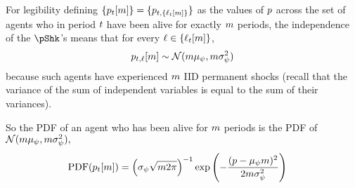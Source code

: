 \documentclass[\econtexRoot/BufferStockTheory.tex]{subfiles}
\begin{document}
For legibility defining $\{p_{{}t}[m]\} = \{p_{{}t,\{\ell_{{}t}[m]\}}\}$ as the values of $p$ across the set of agents who in period ${}t$ have been alive for exactly $m$ periods, the independence of the $\pShk$'s means that for every $\ell \in \{\ell_{t}[m]\}$,
\begin{equation}\begin{gathered}\begin{aligned}
  p_{t,\ell}[m] \sim \mathcal{N}(m \mu_{\psi},m \sigma^{2}_{\psi}) \label{eq:dstpnm}
\end{aligned}\end{gathered}\end{equation}
because such agents have experienced $m$ IID permanent shocks (recall that the variance of the sum of independent variables is equal to the sum of their variances).


\newcommand{\PDF}{\textrm{PDF}}
So the PDF of an agent who has been alive for $m$ periods is the PDF of $\mathcal{N}(m \mu_{\psi},m \sigma^{2}_{\psi}),$
\begin{equation}\begin{gathered}\begin{aligned}
  \PDF(\pLog_{\FutPer}[\LooPer]) & = \left(
                                   {\sigma_{\DnsShk}\sqrt{\LooPer 2 \pi}}\right)^{-1} \exp\left(-\frac{(\pLog- \pShkMean \LooPer )^{2}}{2 \LooPer \sigma^{2}_{\DnsShk}}\right)
\end{aligned}\end{gathered}\end{equation}
\end{document}
